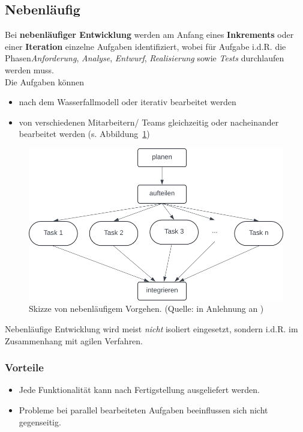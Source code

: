 \subsection{Nebenläufig}

\noindent
Bei \textbf{nebenläufiger Entwicklung} werden am Anfang eines \textbf{Inkrements} oder einer \textbf{Iteration} einzelne Aufgaben identifiziert, wobei für Aufgabe i.d.R. die Phasen\textit{Anforderung}, \textit{Analyse},  \textit{Entwurf}, \textit{Realisierung} sowie \textit{Tests} durchlaufen werden muss.\\
Die Aufgaben können
\begin{itemize}
    \item nach dem Wasserfallmodell oder iterativ bearbeitet werden
    \item von verschiedenen Mitarbeitern/ Teams gleichzeitig oder nacheinander bearbeitet werden (s. Abbildung~\ref{fig:nebenlaeufig})
\end{itemize}


\begin{figure}
    \centering
    \includegraphics[scale=0.4]{chapters/Prozessmodelle/img/nebenlaeufigkeit}
    \caption{Skizze von nebenläufigem Vorgehen. (Quelle: in Anlehnung an \cite[29]{Wed09})}
    \label{fig:nebenlaeufig}
\end{figure}


\noindent
Nebenläufige Entwicklung wird meist \textit{nicht} isoliert eingesetzt, sondern i.d.R. im Zusammenhang mit agilen Verfahren.

\subsubsection*{Vorteile}

\begin{itemize}
    \item Jede Funktionalität kann nach Fertigstellung ausgeliefert werden.
    \item Probleme bei parallel bearbeiteten Aufgaben beeinflussen sich nicht gegenseitig.
\end{itemize}

